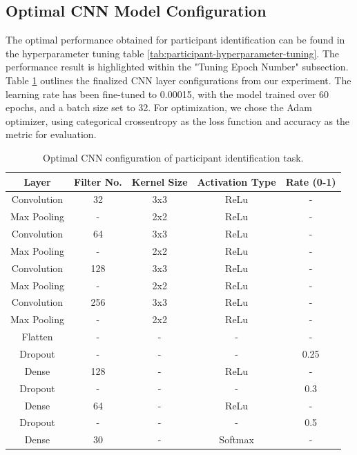 \documentclass{l4proj}
\begin{document}
\subsection{Optimal CNN Model Configuration}
The optimal performance obtained for participant identification can be found in the hyperparameter tuning table \ref{tab:participant-hyperparameter-tuning}. The performance result is highlighted within the "Tuning Epoch Number" subsection. Table \ref{tab:participant-final-CNN-configuration} outlines the finalized CNN layer configurations from our experiment. The learning rate has been fine-tuned to 0.00015, with the model trained over 60 epochs, and a batch size set to 32. For optimization, we chose the Adam optimizer, using categorical crossentropy as the loss function and accuracy as the metric for evaluation.

\begin{table}[h]
    \centering
    \begin{tabular}{ccccc}
        \toprule
        \textbf{Layer} & \textbf{Filter No.} & \textbf{Kernel Size} & \textbf{Activation Type} & \textbf{Rate (0-1)} \\
        \midrule
        \midrule
        Convolution & 32  & 3x3 & ReLu & - \\
        Max Pooling & - & 2x2 & ReLu & - \\
        Convolution & 64 & 3x3 & ReLu & - \\
        Max Pooling & - & 2x2 & ReLu & - \\
        Convolution & 128 & 3x3 & ReLu & - \\
        Max Pooling & - & 2x2 & ReLu & - \\
        Convolution & 256 & 3x3 & ReLu & - \\
        Max Pooling & - & 2x2 & ReLu & - \\
        Flatten & - & - & - & - \\
        Dropout & - & - & - & 0.25 \\
        Dense & 128 & - & ReLu & - \\
        Dropout & - & - & - & 0.3 \\
        Dense & 64 & - & ReLu & - \\
        Dropout & - & - & - & 0.5 \\
        Dense & 30 & - & Softmax & - \\
        \bottomrule
    \end{tabular}
    \caption{Optimal CNN configuration of participant identification task.}
    \label{tab:participant-final-CNN-configuration}
\end{table}
\end{document}
